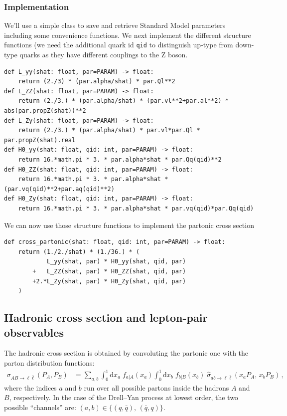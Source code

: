 \documentclass[11pt]{article}
\begin{document}
\subsubsection{Implementation}
\label{sec:org5c49de5}
We'll use a simple class to save and retrieve Standard Model parameters including some convenience functions.
We next implement the different structure functions (we need the additional quark id \texttt{qid} to distinguish up-type from down-type quarks as they have different couplings to the Z boson.
\begin{verbatim}
def L_yy(shat: float, par=PARAM) -> float:
    return (2./3) * (par.alpha/shat) * par.Ql**2
def L_ZZ(shat: float, par=PARAM) -> float:
    return (2./3.) * (par.alpha/shat) * (par.vl**2+par.al**2) * abs(par.propZ(shat))**2
def L_Zy(shat: float, par=PARAM) -> float:
    return (2./3.) * (par.alpha/shat) * par.vl*par.Ql * par.propZ(shat).real
def H0_yy(shat: float, qid: int, par=PARAM) -> float:
    return 16.*math.pi * 3. * par.alpha*shat * par.Qq(qid)**2
def H0_ZZ(shat: float, qid: int, par=PARAM) -> float:
    return 16.*math.pi * 3. * par.alpha*shat * (par.vq(qid)**2+par.aq(qid)**2)
def H0_Zy(shat: float, qid: int, par=PARAM) -> float:
    return 16.*math.pi * 3. * par.alpha*shat * par.vq(qid)*par.Qq(qid)
\end{verbatim}
We can now use those structure functions to implement the partonic cross section
\begin{verbatim}
def cross_partonic(shat: float, qid: int, par=PARAM) -> float:
    return (1./2./shat) * (1./36.) * (
            L_yy(shat, par) * H0_yy(shat, qid, par)
        +   L_ZZ(shat, par) * H0_ZZ(shat, qid, par)
        +2.*L_Zy(shat, par) * H0_Zy(shat, qid, par)
    )
\end{verbatim}

\subsection{Hadronic cross section and lepton-pair observables}
\label{sec:orge0b1fcc}
The hadronic cross section is obtained by convoluting the partonic one with the parton distribution functions:
\begin{align}
  \sigma_{A B \to \ell\bar{\ell}} (P_A, P_B)
  &=
  \sum_{a,b}
  \int_0^1\mathrm{d}x_a \; f_{a\vert A}(x_a)
  \int_0^1\mathrm{d}x_b \; f_{b\vert B}(x_b) \;
  \hat{\sigma}_{ab\to\ell\bar{\ell}}(x_a P_A,\,x_b P_B)
  \,,
\end{align}
where the indices \(a\) and \(b\) run over all possible partons inside the hadrons \(A\) and \(B\), respectively.
In the case of the Drell--Yan process at lowest order, the two possible ``channels'' are:  \((a,b) \in \{(q,\bar{q}),\,(\bar{q},q)\}\).
\end{document}
